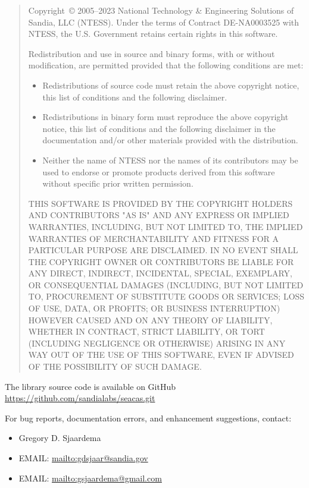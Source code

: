 \begin{quote}
Copyright~\copyright{} 2005--2023 National Technology \& Engineering Solutions
of Sandia, LLC (NTESS).  Under the terms of Contract DE-NA0003525 with
NTESS, the U.S. Government retains certain rights in this software.

Redistribution and use in source and binary forms, with or without
modification, are permitted provided that the following conditions are
met:

\begin{itemize}
\item Redistributions of source code must retain the above copyright
      notice, this list of conditions and the following disclaimer.

\item Redistributions in binary form must reproduce the above
      copyright notice, this list of conditions and the following
      disclaimer in the documentation and/or other materials provided
      with the distribution.

\item Neither the name of NTESS nor the names of its
      contributors may be used to endorse or promote products derived
      from this software without specific prior written permission.
\end{itemize}

THIS SOFTWARE IS PROVIDED BY THE COPYRIGHT HOLDERS AND CONTRIBUTORS
"AS IS" AND ANY EXPRESS OR IMPLIED WARRANTIES, INCLUDING, BUT NOT
LIMITED TO, THE IMPLIED WARRANTIES OF MERCHANTABILITY AND FITNESS FOR
A PARTICULAR PURPOSE ARE DISCLAIMED. IN NO EVENT SHALL THE COPYRIGHT
OWNER OR CONTRIBUTORS BE LIABLE FOR ANY DIRECT, INDIRECT, INCIDENTAL,
SPECIAL, EXEMPLARY, OR CONSEQUENTIAL DAMAGES (INCLUDING, BUT NOT
LIMITED TO, PROCUREMENT OF SUBSTITUTE GOODS OR SERVICES; LOSS OF USE,
DATA, OR PROFITS; OR BUSINESS INTERRUPTION) HOWEVER CAUSED AND ON ANY
THEORY OF LIABILITY, WHETHER IN CONTRACT, STRICT LIABILITY, OR TORT
(INCLUDING NEGLIGENCE OR OTHERWISE) ARISING IN ANY WAY OUT OF THE USE
OF THIS SOFTWARE, EVEN IF ADVISED OF THE POSSIBILITY OF SUCH DAMAGE.
\end{quote}

The \exo{} library source code is available on GitHub
\url{https://github.com/sandialabs/seacas.git}

For bug reports, documentation errors, and enhancement suggestions,
contact:
\begin{itemize}
   \item Gregory D. Sjaardema
   \item EMAIL: \url{mailto:gdsjaar@sandia.gov}
   \item EMAIL: \url{mailto:gsjaardema@gmail.com}
\end{itemize}
